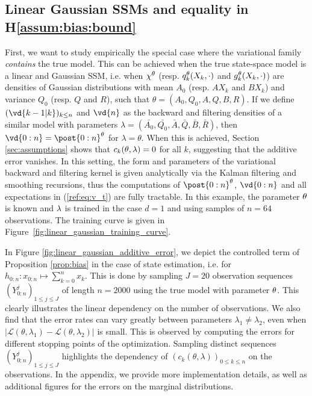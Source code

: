 \documentclass{article}
\begin{document}
\subsection{Linear Gaussian SSMs and equality in H\ref{assum:bias:bound}}
\label{sec:experiments:linear_gaussian}
First, we want to study empirically the special case where the variational family \textit{contains} the true model. This can be achieved when the true state-space model  is a linear and Gaussian SSM, i.e. when $\chi^\theta$ (resp. $q_{k}^{\theta}(X_k, \cdot)$ and $g_{k}^{\theta}(X_k,\cdot)$) are densities of Gaussian distributions with mean $A_0$ (resp. $A X_k$ and $B X_k$) and variance $Q_0$ (resp. $Q$ and $R$), such that $\theta = (A_0, Q_0, A, Q, B, R)$. If we define $(\vd{k-1 \vert k})_{k \leq n}$ and $\vd{n}$ as the backward and filtering densities of a similar model with parameters $\lambda = (\bar{A_0}, \bar{Q_0}, \bar{A}, \bar{Q}, \bar{B}, \bar{R})$, then $\vd{0:n} = \post{0:n}^\parvec$ for $\lambda = \theta$. When this is achieved, Section \ref{sec:assumptions} shows that $c_k(\theta, \lambda) = 0$ for all $k$, suggesting that the additive error vanishes. In this setting, the form and parameters of the variational backward and filtering kernel is given analytically via the Kalman filtering and smoothing recursions, thus the computations of $\post{0:n}^\parvec$, $\vd{0:n}$ and all expectations in (\ref{ref:eq:v_t}) are fully tractable. In this  example, the parameter $\theta$ is known and $\lambda$ is trained in the case $d=1$ and using samples of $n=64$ observations. The training curve is given in Figure~\ref{fig:linear_gaussian_training_curve}.


In Figure \ref{fig:linear_gaussian_additive_error}, we depict the controlled term of Proposition \ref{prop:bias} in the case of state estimation, i.e. for $h_{0:n}: x_{0:n} \mapsto \sum_{k=0}^n x_k$. This is done by sampling $J=20$ observation sequences $(Y^j_{0:n})_{1\leq j \leq J}$ of length $n=2000$ using the true model with parameter $\theta$. This clearly illustrates the linear dependency on the number of observations. We also find that the error rates can vary greatly between parameters $\lambda_1 \neq \lambda_2$, even when $|\mathcal{L}(\theta,\lambda_1) - \mathcal{L}(\theta,\lambda_2)|$ is small. This is observed by computing the errors for different stopping points of the optimization. Sampling distinct sequences $(Y^j_{0:n})_{1\leq j \leq J}$  highlights the dependency of $(c_k(\theta,\lambda))_{0\leq k \leq n}$ on the observations. In the appendix, we provide more implementation details, as well as additional figures for the errors on the marginal distributions.
\end{document}
